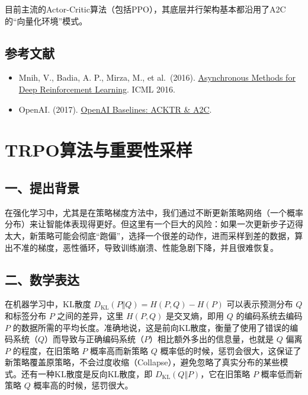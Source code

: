目前主流的Actor-Critic算法（包括PPO），其底层并行架构基本都沿用了A2C的``向量化环境''模式。

\hypertarget{ux53c2ux8003ux6587ux732e-56}{%
\subsection{参考文献}\label{ux53c2ux8003ux6587ux732e-56}}

\vspace{0.25em}
\begin{itemize}
\tightlist
\item
  Mnih, V., Badia, A. P., Mirza, M., et al.~(2016). \href{https://arxiv.org/abs/1602.01783}{Asynchronous Methods for Deep Reinforcement Learning}. ICML 2016.
\item
  OpenAI. (2017). \href{https://openai.com/index/openai-baselines-acktr-a2c/}{OpenAI Baselines: ACKTR \& A2C}.
\end{itemize}

\clearpage

\hypertarget{trpoux7b97ux6cd5ux4e0eux91cdux8981ux6027ux91c7ux6837}{%
\section{TRPO算法与重要性采样}\label{trpoux7b97ux6cd5ux4e0eux91cdux8981ux6027ux91c7ux6837}}

\hypertarget{ux4e00ux63d0ux51faux80ccux666f}{%
\subsection{一、提出背景}\label{ux4e00ux63d0ux51faux80ccux666f}}

在强化学习中，尤其是在策略梯度方法中，我们通过不断更新策略网络（一个概率分布）来让智能体表现得更好。但这里有一个巨大的风险：如果一次更新步子迈得太大，新策略可能会彻底``跑偏''，选择一个很差的动作，进而采样到差的数据，算出不准的梯度，恶性循环，导致训练崩溃、性能急剧下降，并且很难恢复。

\hypertarget{ux4e8cux6570ux5b66ux8868ux8fbe-1}{%
\subsection{二、数学表达}\label{ux4e8cux6570ux5b66ux8868ux8fbe-1}}

在机器学习中，KL散度 \(D_{\mathrm{KL}}(P\Vert Q)=H(P,Q)-H(P)\) 可以表示预测分布 \(Q\) 和标签分布 \(P\) 之间的差异，这里 \(H(P,Q)\) 是交叉熵，即用 \(Q\) 的编码系统去编码 \(P\) 的数据所需的平均长度。准确地说，这是前向KL散度，衡量了使用了错误的编码系统（\(Q\)）而导致与正确编码系统（\(P\)）相比额外多出的信息量，也就是 \(Q\) 偏离 \(P\) 的程度，在旧策略 \(P\) 概率高而新策略 \(Q\) 概率低的时候，惩罚会很大，这保证了新策略覆盖原策略，不会过度收缩（Collapse），避免忽略了真实分布的某些模式。还有一种KL散度是反向KL散度，即 \(D_{\mathrm{KL}}(Q\Vert P)\)，它在旧策略 \(P\) 概率低而新策略 \(Q\) 概率高的时候，惩罚很大。

